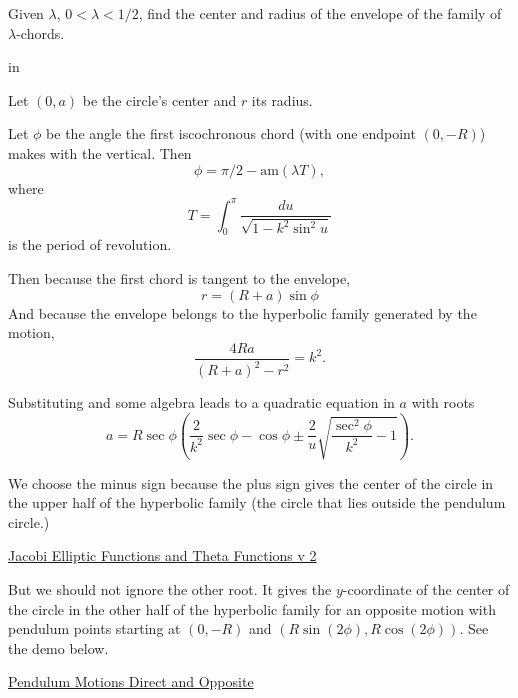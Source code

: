 \documentclass{ximera}
\newcommand{\pskip}{\vskip 0.1 in}
\begin{document}
\begin{exploration}

Given $\lambda$, $0 < \lambda < 1/2$, find the center and radius of the envelope of the family of $\lambda$-chords. 

\pskip

Let $(0,a)$ be the circle's center and $r$ its radius.

Let $\phi$ be the angle the first iscochronous chord (with one endpoint $(0,-R)$) makes with the vertical. Then
\[
      \phi = \pi/2 - \text{am}(\lambda T) ,
\]
where
\[
  T = \int_0^{\pi} \frac{du}{\sqrt{1-k^2\sin^2 u}}
\] 
is the period of revolution.

Then because the first chord is tangent to the envelope,
\[
     r = (R+a) \sin \phi
\]
And because the envelope belongs to the hyperbolic family generated by the motion,
\[
  \frac{4Ra}{(R+a)^2 - r^2} = k^2 .
\]

Substituting and some algebra leads to a quadratic equation in $a$ with roots
\[
  a =   R \sec \phi \left( \frac{2}{k^2} \sec \phi - \cos\phi \pm   \frac{2}{u} \sqrt{\frac{\sec^2\phi}{k^2} - 1}   \right) .
\]

We choose the minus sign because the plus sign gives the center of the circle in the upper half of the hyperbolic family (the circle that lies outside the pendulum circle.)



\begin{onlineOnly}
    \begin{center}
\end{center}
\end{onlineOnly}

\href{https://www.desmos.com/calculator/svb8pwijet}{Jacobi Elliptic Functions and Theta Functions v 2}

But we should not ignore the other root. It gives the $y$-coordinate of the center of the circle in the other half of the hyperbolic family for an opposite motion with pendulum points starting at $(0,-R)$ and $(R\sin(2\phi),R\cos(2\phi))$. See the demo below.

\begin{onlineOnly}
    \begin{center}
\end{center}
\end{onlineOnly}

\href{https://www.desmos.com/calculator/swzgtt3nup}{Pendulum Motions Direct and Opposite}


\end{exploration}
\end{document}
